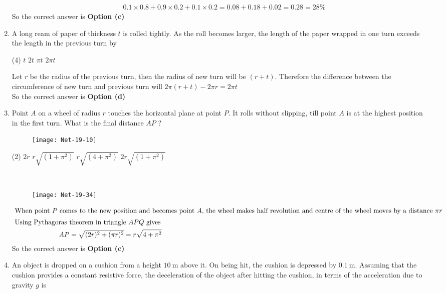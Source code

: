 \begin{enumerate}
\begin{answer}
\begin{align*}
&0.1 \times 0.8+0.9 \times 0.2+0.1 \times 0.2=0.08+0.18+0.02=0.28=28 \%
	\end{align*}
		So the correct answer is \textbf{Option (c)}
\end{answer}
\item  A long ream of paper of thickness $t$ is rolled tightly. As the roll becomes larger, the length of the paper wrapped in one turn exceeds the length in the previous turn by
 \begin{tasks}(4)
	\task[\textbf{a.}]$t$
	\task[\textbf{b.}]$2 t$
	\task[\textbf{c.}]$\pi t$
	\task[\textbf{d.}] $2 \pi t$
\end{tasks}
\begin{answer}
 Let $r$ be the radius of the previous turn, then the radius of new turn will be $(r+t)$.
	Therefore the difference between the circumference of new turn and previous turn will $2 \pi(r+t)-2 \pi r=2 \pi t$\\
		So the correct answer is \textbf{Option (d)}
\end{answer}
 \item   Point $A$ on a wheel of radius $r$ touches the horizontal plane at point $P$. It rolls without slipping, till point $A$ is at the highest position in the first turn. What is the final distance $A P$ ?
 \begin{figure}[H]
 	\centering
 	\texttt{[image: Net-19-10]}
 \end{figure}
 \begin{tasks}(2)
	\task[\textbf{a.}]$2 r$
	\task[\textbf{b.}]$r \sqrt{\left(1+\pi^{2}\right)}$
	\task[\textbf{c.}] $r \sqrt{\left(4+\pi^{2}\right)}$
	\task[\textbf{d.}] $2 r \sqrt{\left(1+\pi^{2}\right)}$
\end{tasks}
\begin{answer}$\left. \right. $
	\begin{figure}[H]
		\centering
		\texttt{[image: Net-19-34]}
	\end{figure}
	\begin{align*}
	\intertext{ When point $P$ comes to the new position and becomes point $A$, the wheel makes half revolution and centre of the wheel moves by a distance $\pi r$}
\text{	Using Pythagoras }&\text{theorem in triangle $A P Q$ gives}\\
	A P&=\sqrt{(2 r)^{2}+(\pi r)^{2}}=r \sqrt{4+\pi^{2}}
	\end{align*}
		So the correct answer is \textbf{Option (c)}
\end{answer}
\item  An object is dropped on a cushion from a height $10 \mathrm{~m}$ above it. On being hit, the cushion is depressed by $0.1 \mathrm{~m}$. Assuming that the cushion provides a constant resistive force, the deceleration of the object after hitting the cushion, in terms of the acceleration due to gravity $g$ is

\end{enumerate}
